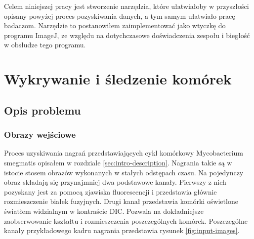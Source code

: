 \documentclass[declaration,shortabstract,mgr]{iithesis}
\begin{document}
Celem niniejszej pracy jest stworzenie narzędzia, które ułatwiałoby w przyszłości opisany powyżej proces pozyskiwania danych, a tym samym ułatwiało pracę badaczom.
Narzędzie to postanowiłem zaimplementować jako wtyczkę do programu ImageJ, ze względu na dotychczasowe doświadczenia zespołu i biegłość w obsłudze tego programu.



\chapter{Wykrywanie i śledzenie komórek}
\label{cha:detection-and-tracking}



\section{Opis problemu}
\label{sec:problem}

\subsection{Obrazy wejściowe}
\label{sec:input-images}

Proces uzyskiwania nagrań przedstawiających cykl komórkowy Mycobacterium smegmatis opisałem w rozdziale \ref{sec:intro-description}.
Nagrania takie są w istocie stosem obrazów wykonanych w stałych odstępach czasu.
Na pojedynczy obraz składają się przynajmniej dwa podstawowe kanały.
Pierwszy z nich pozyskany jest za pomocą zjawiska fluorescencji i przedstawia głównie rozmieszczenie białek fuzyjnych.
Drugi kanał przedstawia komórki oświetlone światłem widzialnym w kontraście DIC.
Pozwala na dokładniejsze zaobserwowanie kształtu i rozmieszczenia poszczególnych komórek.
Poszczególne kanały przykładowego kadru nagrania przedstawia rysunek \ref{fig:input-images}.
\end{document}
